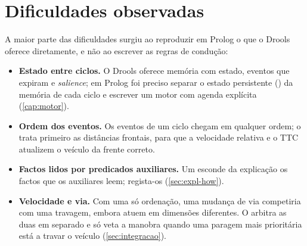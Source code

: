 \chapter{Dificuldades observadas}
\label{cap:dificuldades}

A maior parte das dificuldades surgiu ao reproduzir em Prolog o que o Drools
oferece diretamente, e não ao escrever as regras de condução:

\begin{itemize}
  \item \textbf{Estado entre ciclos.} O Drools oferece memória com estado,
    eventos que expiram e \emph{salience}; em Prolog foi preciso separar o estado
    persistente () da memória de cada ciclo e escrever um
    motor com agenda explícita (\cref{cap:motor}).
  \item \textbf{Ordem dos eventos.} Os eventos de um ciclo chegam em qualquer
    ordem; o  trata primeiro as distâncias frontais, para
    que a velocidade relativa e o TTC atualizem o veículo da frente correto.
  \item \textbf{Factos lidos por predicados auxiliares.} Um  esconde
    da explicação os factos que os auxiliares leem;  regista-os
    (\cref{sec:expl-how}).
  \item \textbf{Velocidade e via.} Com uma só ordenação, uma mudança de via
    competiria com uma travagem, embora atuem em dimensões diferentes. O
     arbitra as duas em separado e só veta a manobra quando
    uma paragem mais prioritária está a travar o veículo
    (\cref{sec:integracao}).
\end{itemize}

